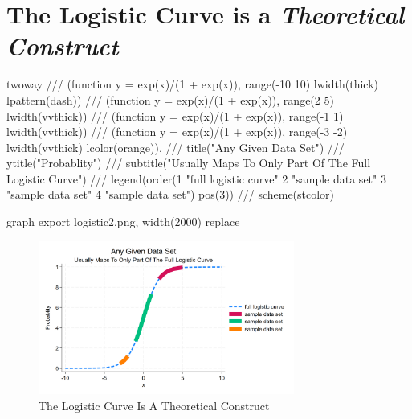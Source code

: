 \documentclass[
  letterpaper,
  DIV=11,
  numbers=noendperiod]{scrartcl}
\newenvironment{Shaded}{\begin{snugshade}}{\end{snugshade}}
\newcommand{\BaseNTok}[1]{\textcolor[rgb]{0.68,0.00,0.00}{#1}}
\newcommand{\CommentTok}[1]{\textcolor[rgb]{0.37,0.37,0.37}{#1}}
\newcommand{\DecValTok}[1]{\textcolor[rgb]{0.68,0.00,0.00}{#1}}
\newcommand{\FunctionTok}[1]{\textcolor[rgb]{0.28,0.35,0.67}{#1}}
\newcommand{\KeywordTok}[1]{\textcolor[rgb]{0.00,0.23,0.31}{#1}}
\newcommand{\NormalTok}[1]{\textcolor[rgb]{0.00,0.23,0.31}{#1}}
\newcommand{\StringTok}[1]{\textcolor[rgb]{0.13,0.47,0.30}{#1}}
\begin{document}
\hypertarget{the-logistic-curve-is-a-theoretical-construct}{%
\section{\texorpdfstring{The Logistic Curve is a \emph{Theoretical
Construct}}{The Logistic Curve is a Theoretical Construct}}\label{the-logistic-curve-is-a-theoretical-construct}}

\begin{Shaded}
\begin{Highlighting}[]

\KeywordTok{twoway} \CommentTok{///}
\NormalTok{(}\KeywordTok{function} \FunctionTok{y}\NormalTok{ = }\FunctionTok{exp}\NormalTok{(x)/(1 + }\FunctionTok{exp}\NormalTok{(x)), }\KeywordTok{range}\NormalTok{({-}10 10) lwidth(thick) lpattern(}\KeywordTok{dash}\NormalTok{)) }\CommentTok{///}
\NormalTok{(}\KeywordTok{function} \FunctionTok{y}\NormalTok{ = }\FunctionTok{exp}\NormalTok{(x)/(1 + }\FunctionTok{exp}\NormalTok{(x)), }\KeywordTok{range}\NormalTok{(2 5) lwidth(vvthick)) }\CommentTok{///}
\NormalTok{(}\KeywordTok{function} \FunctionTok{y}\NormalTok{ = }\FunctionTok{exp}\NormalTok{(x)/(1 + }\FunctionTok{exp}\NormalTok{(x)), }\KeywordTok{range}\NormalTok{({-}1 1) lwidth(vvthick)) }\CommentTok{///}
\NormalTok{(}\KeywordTok{function} \FunctionTok{y}\NormalTok{ = }\FunctionTok{exp}\NormalTok{(x)/(1 + }\FunctionTok{exp}\NormalTok{(x)), }\KeywordTok{range}\NormalTok{({-}3 {-}2) lwidth(vvthick) lcolor(}\BaseNTok{orange}\NormalTok{)), }\CommentTok{///}
\BaseNTok{title}\NormalTok{(}\StringTok{"Any Given Data Set"}\NormalTok{) }\CommentTok{///}
\BaseNTok{ytitle}\NormalTok{(}\StringTok{"Probablity"}\NormalTok{) }\CommentTok{///}
\BaseNTok{subtitle}\NormalTok{(}\StringTok{"Usually Maps To Only Part Of The Full Logistic Curve"}\NormalTok{) }\CommentTok{///}
\BaseNTok{legend}\NormalTok{(}\KeywordTok{order}\NormalTok{(1 }\StringTok{"full logistic curve"}\NormalTok{ 2 }\StringTok{"sample data set"}\NormalTok{ 3 }\StringTok{"sample data set"}\NormalTok{ 4 }\StringTok{"sample data set"}\NormalTok{) pos(3)) }\CommentTok{///}
\DecValTok{scheme}\NormalTok{(stcolor)}

\KeywordTok{graph} \KeywordTok{export}\NormalTok{ logistic2.png, }\KeywordTok{width}\NormalTok{(2000) }\KeywordTok{replace}
\end{Highlighting}
\end{Shaded}

\begin{figure}

{\centering \includegraphics[width=0.75\textwidth,height=\textheight]{logistic2.png}

}

\caption{The Logistic Curve Is A Theoretical Construct}

\end{figure}
\end{document}
